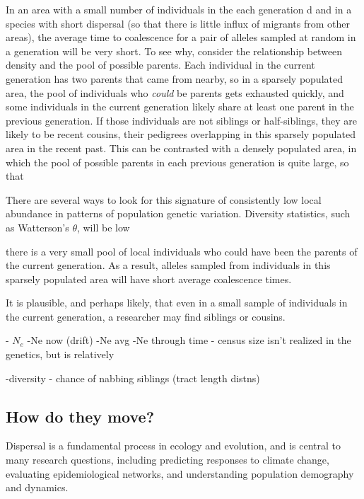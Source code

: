 \documentclass{ar-1col}
\begin{document}
In an area with a small number of individuals in the each generation d
and in a species with short dispersal 
(so that there is little influx of migrants from other areas), 
the average time to coalescence for a pair of alleles sampled 
at random in a generation will be very short.
To see why, consider the relationship between density 
and the pool of possible parents.
Each individual in the current generation has two parents that came from nearby,
so in a sparsely populated area, 
the pool of individuals who \emph{could} be parents gets exhausted quickly, 
and some individuals in the current generation 
likely share at least one parent in the previous generation.
If those individuals are not siblings or half-siblings,
they are likely to be recent cousins, 
their pedigrees overlapping in this sparsely populated area 
in the recent past.
This can be contrasted with a densely populated area, 
in which the pool of possible parents in each previous generation is quite large, 
so that 


There are several ways to look for this signature 
of consistently low local abundance 
in patterns of population genetic variation.
Diversity statistics, such as Watterson's $\theta$, 
will be low



there is a very small pool of local individuals who could 
have been the parents of the current generation.
As a result, alleles sampled from individuals in this sparsely populated area 
will have short average coalescence times.


It is plausible, and perhaps likely,
that even in a small sample of individuals in the current generation, 
a researcher may find siblings or cousins.



        

        - $N_e$
        	-Ne now (drift)
	-Ne avg
	-Ne through time
		- census size isn't realized in the genetics, but is relatively
	
	-diversity - chance of nabbing siblings (tract length distns)

\subsection{How do they move?}
Dispersal is a fundamental process in ecology and evolution, 
and is central to many research questions, 
including predicting responses to climate change,
evaluating epidemiological networks, 
and understanding population demography and dynamics.
\end{document}
